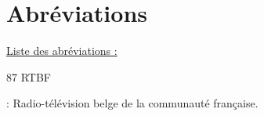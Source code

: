 \section{Abréviations}
\underline  {Liste des abréviations :} 

\hypertarget{RTBF}{87 RTBF} : Radio-télévision belge de la communauté française.